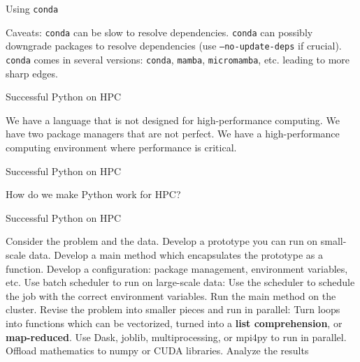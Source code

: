 \documentclass[aspectratio=169]{beamer}
\begin{document}
    \begin{frame}{Using \texttt{conda}}
        \begin{outline}
            \1 Caveats:
                \2 \texttt{conda} can be slow to resolve dependencies.
                \2 \texttt{conda} can possibly downgrade packages to resolve dependencies (use \texttt{--no-update-deps} if crucial).
                \2 \texttt{conda} comes in several versions: \texttt{conda}, \texttt{mamba}, \texttt{micromamba}, etc. leading to more sharp edges.
        \end{outline}
    \end{frame}

    \begin{frame}{Successful Python on HPC}
        \begin{outline}
            \1 We have a language that is not designed for high-performance computing.
            \1 We have two package managers that are not perfect.
            \1 We have a high-performance computing environment where performance is critical.
        \end{outline}
    \end{frame}

    \begin{frame}{Successful Python on HPC}
        \begin{outline}
            \centering
            \Huge How do we make Python work for HPC?
        \end{outline}
    \end{frame}

    \begin{frame}{Successful Python on HPC}
        \begin{outline}
                \1 Consider the problem and the data. 
                \1 Develop a prototype you can run on small-scale data.
                    \2 Develop a main method which encapsulates the prototype as a function. 
                    \2 Develop a configuration: package management, environment variables, etc.
                \1 Use batch scheduler to run on large-scale data:
                    \2 Use the scheduler to schedule the job with the correct environment variables.
                    \2 Run the main method on the cluster.
                \1 Revise the problem into smaller pieces and run in parallel:
                    \2 Turn loops into functions which can be vectorized, turned into a \textbf{list comprehension}, or \textbf{map-reduced}.
                    \2 Use Dask, joblib, multiprocessing, or mpi4py to run in parallel.
                    \2 Offload mathematics to numpy or CUDA libraries. 
                \1 Analyze the results
        \end{outline}
    \end{frame}
\end{document}
